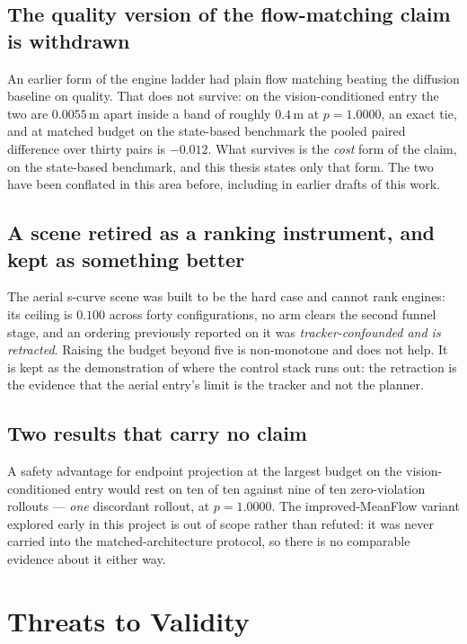\subsection*{The quality version of the flow-matching claim is withdrawn}

An earlier form of the engine ladder had plain flow matching beating the diffusion baseline on
quality. That does not survive: on the vision-conditioned entry the two are $0.0055$\,m apart inside
a band of roughly $0.4$\,m at $p = 1.0000$, an exact tie, and at matched budget on the state-based
benchmark the pooled paired difference over thirty pairs is $-0.012$. What survives is the
\emph{cost} form of the claim, on the state-based benchmark, and this thesis states only that form.
The two have been conflated in this area before, including in earlier drafts of this work.

\subsection*{A scene retired as a ranking instrument, and kept as something better}

The aerial s-curve scene was built to be the hard case and cannot rank engines: its ceiling is
$0.100$ across forty configurations, no arm clears the second funnel stage, and an ordering
previously reported on it was \emph{tracker-confounded and is retracted}. Raising the budget beyond
five is non-monotone and does not help. It is kept as the demonstration of where the control stack runs out: the retraction is the evidence that the aerial entry's limit is the tracker and not the planner.

\subsection*{Two results that carry no claim}

A safety advantage for endpoint projection at the largest budget on the vision-conditioned entry
would rest on ten of ten against nine of ten zero-violation rollouts --- \emph{one} discordant
rollout, at $p = 1.0000$. The improved-MeanFlow variant explored early in this project is out of
scope rather than refuted: it was never carried into the matched-architecture protocol, so there is
no comparable evidence about it either way.

\section{Threats to Validity}\label{sec:disc:threats}

